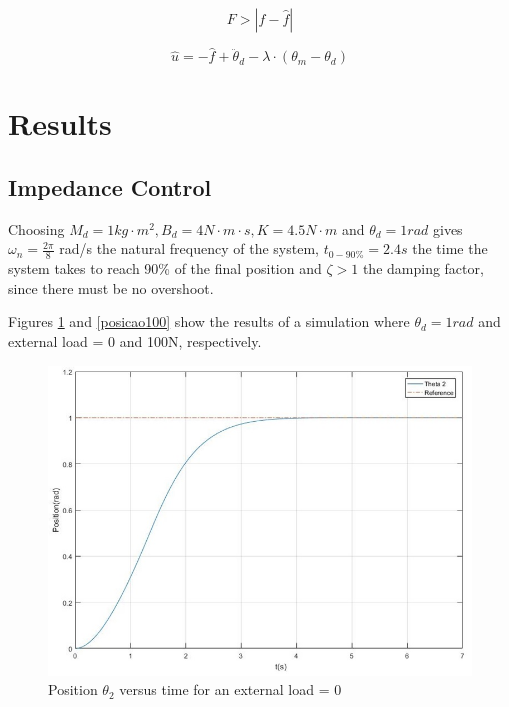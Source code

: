 \begin{equation}
\label{eq:Fsm}
F > |f-\hat{f}|
\end{equation}

\begin{equation}
\label{eq:uhat}
\hat{u} = -\hat{f} + \ddot{\theta}_{d}-\lambda \cdot (\theta_m - \theta_{d})
\end{equation}

\section{Results}

\subsection{Impedance Control}

Choosing \(M_d = 1 kg \cdot m^2, B_d = 4 N \cdot m \cdot s, K = 4.5 N \cdot m\) and \(\theta_d = 1 rad\) gives \(\omega_n = \frac{2\pi}{8}\) rad/s the natural frequency of the system, \(t_{0-90\%} = 2.4 s\) the time the system takes to reach 90\% of the final position and \(\zeta > 1\) the damping factor, since there must be no overshoot.

Figures \ref{posicao0} and \ref{posicao100} show the results of a simulation where \(\theta_d = 1 rad\) and external load = 0 and 100N, respectively.

\begin{figure}[thpb]
      \centering
      \includegraphics[scale=0.5]{Images/posicao_load_0_paper.jpg}
      \caption{Position \(\theta_2\) versus time for an external load = 0}
      \label{posicao0}
   \end{figure}
   
